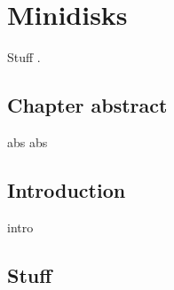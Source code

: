 \renewcommand{\chapid}{minidisk}


\renewcommand{\vector}[1]{#1}
\renewcommand{\matrix}[1]{#1}

\chapter{Minidisks }

Stuff \citep{Ryan17}.

\section{Chapter abstract}

abs abs

\section{Introduction}

intro

\section{Stuff}


